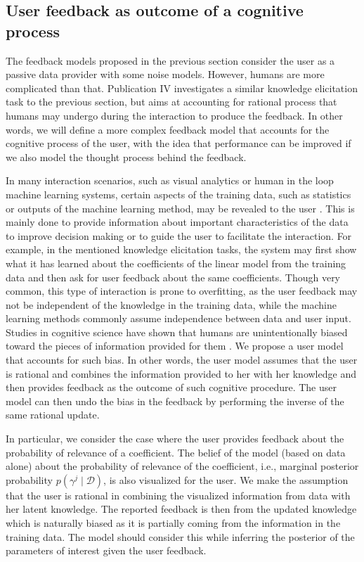 \documentclass[dissertation,math,vertlayout,pdfa,colorlinks]{aaltoseries}
\newcommand{\bD}{\mathcal{D}}
\begin{document}
\subsection{User feedback as outcome of a cognitive process}

The feedback models proposed in the previous section consider the user as a passive data provider with some noise models. However, humans are more complicated than that. Publication IV investigates a similar knowledge elicitation task to the previous section, but aims at accounting for rational process that humans may undergo during the interaction to produce the feedback. In other words, we will define a more complex feedback model that accounts for the cognitive process of the user, with the idea that performance can be improved if we also model the thought process behind the feedback.

In many interaction scenarios, such as visual analytics or human in the loop machine learning systems, certain aspects of the training data, such as statistics or outputs of the machine learning method, may be revealed to the user  \cite{BEAMES_Endert,sacha2017you,Homayun_pairwise_UMAP,muhlbacher2013partition,Talbot2009,van2011baobabview,Kapoor2010,krause2014infuse,sarkar2015interactive,Micallef_elicitation}. This is mainly done to provide information about important characteristics of the data to improve decision making or to guide the user to facilitate the interaction. For example, in the mentioned knowledge elicitation tasks, the system may first show what it has learned about the coefficients of the linear model from the training data and then ask for user feedback about the same coefficients. Though very common, this type of interaction is prone to overfitting, as the user feedback may not be independent of the knowledge in the training data, while the machine learning methods commonly assume independence between data and user input. Studies in cognitive science have shown that humans are unintentionally biased toward the pieces of information provided for them \cite{Tversky1974,garthwaite2005statistical}. We propose a user model that accounts for such bias. In other words, the user model assumes that the user is rational \cite{gershman2015computational} and combines the information provided to her with her knowledge and then provides feedback as the outcome of such cognitive procedure. The user model can then undo the bias in the feedback by performing the inverse of the same rational update.

In particular, we consider the case where the user provides feedback about the probability of relevance of a coefficient. The belief of the model (based on data alone) about the probability of relevance of the coefficient, i.e., marginal posterior probability $p(\gamma^j \mid \bD)$, is also visualized for the user. We make the assumption that the user is rational in combining the visualized information from data with her latent knowledge. The reported feedback is then from the updated knowledge which is naturally biased as it is partially coming from the information in the training data. The model should consider this while inferring the posterior of the parameters of interest given the user feedback.
 
\end{document}
